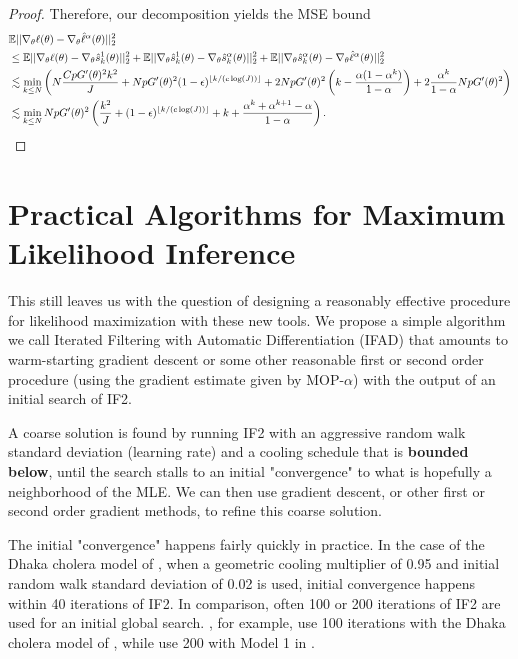 \documentclass{article}
\begin{document}
\begin{proof}
Therefore, our decomposition yields the MSE bound
\begin{align*}
    &\mathbb{E}||\nabla_\theta\ell(\theta) - \nabla_\theta \hat\ell^\alpha(\theta)||_2^2 \\
    &\leq \mathbb{E}||\nabla_\theta\ell(\theta) - \nabla_\theta\hat s_k^1(\theta)||_2^2 + \mathbb{E}||\nabla_\theta\hat s_k^1(\theta) - \nabla_\theta\hat s_k^\alpha(\theta)||_2^2 + \mathbb{E}||\nabla_\theta\hat s_k^\alpha(\theta) -  \nabla_\theta\hat\ell^\alpha(\theta)||_2^2 \\
    &\lesssim \min_{k \leq N} \left(N\frac{CpG'(\theta)^2k^2}{J} + NpG'(\theta)^2(1-\epsilon)^{\lfloor k/(c\log(J)) \rfloor} + 2NpG'(\theta)^2\left(k-\frac{\alpha(1-\alpha^k)}{1-\alpha}\right) + 2\frac{\alpha^k}{1-\alpha}NpG'(\theta)^2\right) \\
    &\lesssim \min_{k \leq N} NpG'(\theta)^2\left(\frac{k^2}{J}+(1-\epsilon)^{\lfloor k/(c\log(J)) \rfloor}+k+\frac{\alpha^k  + \alpha^{k+1} - \alpha}{1-\alpha}\right).
\end{align*}
\end{proof}

\section{Practical Algorithms for Maximum Likelihood Inference}


This still leaves us with the question of designing a reasonably effective procedure for likelihood maximization with these new tools. We propose a simple algorithm we call Iterated Filtering with Automatic Differentiation (IFAD) that amounts to warm-starting gradient descent or some other reasonable first or second order procedure (using the gradient estimate given by MOP-$\alpha$) with the output of an initial search of IF2. 

A coarse solution is found by running IF2 with an aggressive random walk standard deviation (learning rate) and a cooling schedule that is \textbf{bounded below}, until the search stalls to an initial "convergence" to what is hopefully a neighborhood of the MLE. We can then use gradient descent, or other first or second order gradient methods, to refine this coarse solution.

The initial "convergence" happens fairly quickly in practice. In the case of the Dhaka cholera model of \cite{king08}, when a geometric cooling multiplier of 0.95 and initial random walk standard deviation of 0.02 is used, initial convergence happens within 40 iterations of IF2. In comparison, often 100 or 200 iterations of IF2 are used for an initial global search. \cite{ionides15}, for example, use 100 iterations with the Dhaka cholera model of \cite{king08}, while \cite{wheeler23} use 200 with Model 1 in \cite{Lee_haiticholera}. 
\end{document}
